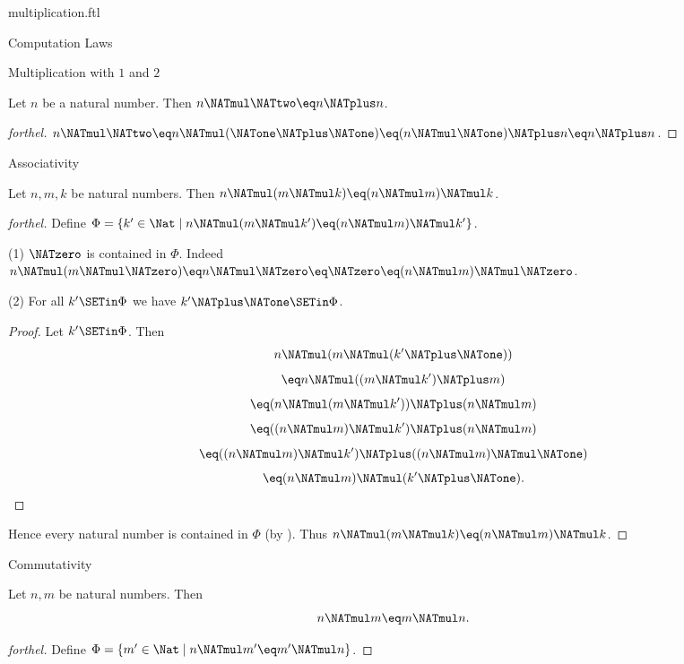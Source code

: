 \documentclass{naproche-library}
\begin{document}
\begin{smodule}[title=Multiplication]{multiplication.ftl}
\begin{sfragment}{Computation Laws}
\begin{sfragment}{Multiplication with $1$ and $2$}
    \begin{corollary}[forthel,id=ARITHMETIC_06_5679541582299136]
      Let $n$ be a natural number.
      Then $n \NATmul \NATtwo \eq n \NATplus n$.
    \end{corollary}
    \begin{proof}[forthel]
      $n \NATmul \NATtwo
        \eq n \NATmul (\NATone \NATplus \NATone)
        \eq (n \NATmul \NATone) \NATplus n
        \eq n \NATplus n$.
    \end{proof}
  \end{sfragment}

  \begin{sfragment}{Associativity}
    \begin{proposition}[forthel,id=ARITHMETIC_06_347295585402880]
      Let $n, m, k$ be natural numbers.
      Then $n \NATmul (m \NATmul k) \eq (n \NATmul m) \NATmul k$.
    \end{proposition}
    \begin{proof}[forthel]
      Define $\Phi = \{ k' \in \Nat \mid n \NATmul (m \NATmul k') \eq (n \NATmul m) \NATmul k' \}$.

      (1) $\NATzero$ is contained in $\Phi$.
      Indeed $n \NATmul (m \NATmul \NATzero)
        \eq n \NATmul \NATzero
        \eq \NATzero
        \eq (n \NATmul m) \NATmul \NATzero$.

      (2) For all $k' \SETin \Phi$ we have $k' \NATplus \NATone \SETin \Phi$.
      \begin{proof}
        Let $k' \SETin \Phi$.
        Then
        \[  n \NATmul (m \NATmul (k' \NATplus \NATone))                          \]
        \[    \eq n \NATmul ((m \NATmul k') \NATplus m)                      \]
        \[    \eq (n \NATmul (m \NATmul k')) \NATplus (n \NATmul m)            \]
        \[    \eq ((n \NATmul m) \NATmul k') \NATplus (n \NATmul m)            \]
        \[    \eq ((n \NATmul m) \NATmul k') \NATplus ((n \NATmul m) \NATmul \NATone)  \]
        \[    \eq (n \NATmul m) \NATmul (k' \NATplus \NATone).                     \]
      \end{proof}

      Hence every natural number is contained in $\Phi$ (by ).
      Thus $n \NATmul (m \NATmul k) \eq (n \NATmul m) \NATmul k$.
    \end{proof}
  \end{sfragment}

  \begin{sfragment}{Commutativity}
    \begin{proposition}[forthel,id=ARITHMETIC_06_1764759896588288]
      Let $n, m$ be natural numbers.
      Then \[ n \NATmul m \eq m \NATmul n. \]
    \end{proposition}
    \begin{proof}[forthel]
      Define $\Phi = \{ m' \in \Nat \mid n \NATmul m' \eq m' \NATmul n \}$.


\end{proof}
\end{sfragment}
\end{sfragment}
\end{smodule}
\end{document}
